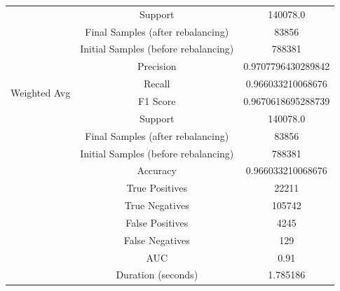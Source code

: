 \begin{longtable}{|c|c|c|}
 & Support & 140078.0 \\
 & Final Samples (after rebalancing) & 83856 \\
 & Initial Samples (before rebalancing) & 788381 \\
\hline
\multirow{4}{*}{Weighted Avg} & Precision & 0.9707796430289842 \\
 & Recall & 0.966033210068676 \\
 & F1 Score & 0.9670618695288739 \\
 & Support & 140078.0 \\
 & Final Samples (after rebalancing) & 83856 \\
 & Initial Samples (before rebalancing) & 788381 \\
\hline
& Accuracy & 0.966033210068676 \\ \hline
& True Positives & 22211 \\ \hline
& True Negatives & 105742 \\ \hline
& False Positives & 4245 \\ \hline
& False Negatives & 129 \\ \hline
& AUC & 0.91 \\ \hline
& Duration (seconds) & 1.785186 \\ \hline
\end{longtable}


